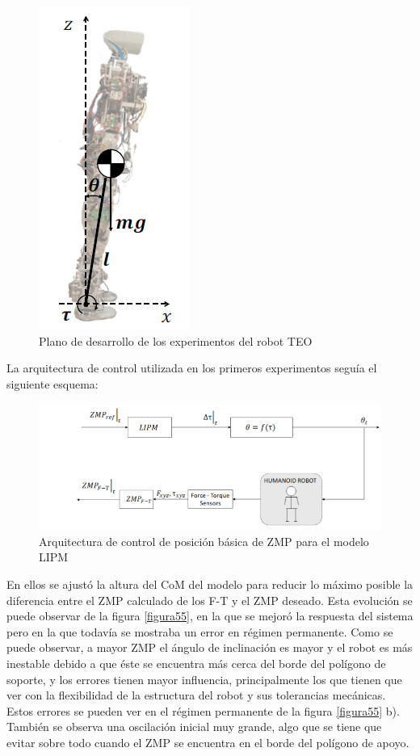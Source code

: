 \begin{figure}[H]
\centering
\includegraphics[scale=0.65]{imagenes/apartado_5/53_postura_inicial_experimental_teo}
\caption{Plano de desarrollo de los experimentos del robot TEO \cite{ref21}}
\label{figura53}
\end{figure}

La arquitectura de control utilizada en los primeros experimentos seguía el siguiente esquema:

\begin{figure}[H]
\centering
\includegraphics[scale=2.2]{imagenes/apartado_5/54_esquema_bucle_abierto}
\caption{Arquitectura de control de posición básica de ZMP para el modelo LIPM}
\label{figura54}
\end{figure}


En ellos se ajustó la altura del CoM del modelo para reducir lo máximo posible la diferencia entre el ZMP calculado de los F-T y el ZMP deseado. Esta evolución se puede observar de la figura \ref{figura55}, en la que se mejoró la respuesta del sistema pero en la que todavía se mostraba un error en régimen permanente. Como se puede observar, a mayor ZMP el ángulo de inclinación es mayor y el robot es más inestable debido a que éste se encuentra más cerca del borde del polígono de soporte, y los errores tienen mayor influencia, principalmente los que tienen que ver con la flexibilidad de la estructura del robot y sus tolerancias mecánicas. Estos errores se pueden ver en el régimen permanente de la figura \ref{figura55} b). También se observa una oscilación inicial muy grande, algo que se tiene que evitar sobre todo cuando el ZMP se encuentra en el borde del polígono de apoyo. 

